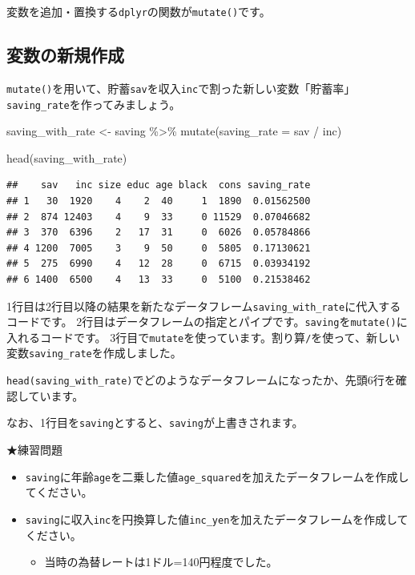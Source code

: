 \documentclass[
]{book}
\newenvironment{Shaded}{\begin{snugshade}}{\end{snugshade}}
\newcommand{\AttributeTok}[1]{\textcolor[rgb]{0.77,0.63,0.00}{#1}}
\newcommand{\FunctionTok}[1]{\textcolor[rgb]{0.00,0.00,0.00}{#1}}
\newcommand{\NormalTok}[1]{#1}
\newcommand{\OtherTok}[1]{\textcolor[rgb]{0.56,0.35,0.01}{#1}}
\newcommand{\SpecialCharTok}[1]{\textcolor[rgb]{0.00,0.00,0.00}{#1}}
\providecommand{\tightlist}{%
  \setlength{\itemsep}{0pt}\setlength{\parskip}{0pt}}
\begin{document}
変数を追加・置換する\texttt{dplyr}の関数が\texttt{mutate()}です。

\hypertarget{ux5909ux6570ux306eux65b0ux898fux4f5cux6210}{%
\subsection{変数の新規作成}\label{ux5909ux6570ux306eux65b0ux898fux4f5cux6210}}

\texttt{mutate()}を用いて、貯蓄\texttt{sav}を収入\texttt{inc}で割った新しい変数「貯蓄率」\texttt{saving\_rate}を作ってみましょう。

\begin{Shaded}
\begin{Highlighting}[]
\NormalTok{saving\_with\_rate }\OtherTok{\textless{}{-}}
\NormalTok{  saving }\SpecialCharTok{\%\textgreater{}\%}
    \FunctionTok{mutate}\NormalTok{(}\AttributeTok{saving\_rate =}\NormalTok{ sav }\SpecialCharTok{/}\NormalTok{ inc)}

\FunctionTok{head}\NormalTok{(saving\_with\_rate)}
\end{Highlighting}
\end{Shaded}

\begin{verbatim}
##    sav   inc size educ age black  cons saving_rate
## 1   30  1920    4    2  40     1  1890  0.01562500
## 2  874 12403    4    9  33     0 11529  0.07046682
## 3  370  6396    2   17  31     0  6026  0.05784866
## 4 1200  7005    3    9  50     0  5805  0.17130621
## 5  275  6990    4   12  28     0  6715  0.03934192
## 6 1400  6500    4   13  33     0  5100  0.21538462
\end{verbatim}

1行目は2行目以降の結果を新たなデータフレーム\texttt{saving\_with\_rate}に代入するコードです。
2行目はデータフレームの指定とパイプです。\texttt{saving}を\texttt{mutate()}に入れるコードです。
3行目で\texttt{mutate}を使っています。割り算\texttt{/}を使って、新しい変数\texttt{saving\_rate}を作成しました。

\texttt{head(saving\_with\_rate)}でどのようなデータフレームになったか、先頭6行を確認しています。

なお、1行目を\texttt{saving}とすると、\texttt{saving}が上書きされます。

★練習問題

\begin{itemize}
\tightlist
\item
  \texttt{saving}に年齢\texttt{age}を二乗した値\texttt{age\_squared}を加えたデータフレームを作成してください。
\item
  \texttt{saving}に収入\texttt{inc}を円換算した値\texttt{inc\_yen}を加えたデータフレームを作成してください。

  \begin{itemize}
  \tightlist
  \item
    当時の為替レートは1ドル=140円程度でした。
  \end{itemize}
\end{itemize}
\end{document}
